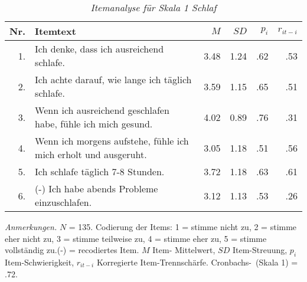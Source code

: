 \begin{table}[htb]
    \caption[Itemanalyse für Skala 1 Schlaf]{\textit {Itemanalyse für Skala 1 Schlaf}} 
    \label{Itemanalyse für Skala 1 Schlaf}
    \centering
    \begin{adjustbox}{width=\textwidth}
    \begin{tabular}{rlrrrr}
      \hline
    Nr.      & Itemtext & \( M \) & \( SD \) & \( p_i \) & \( r_{it-i} \) \\
      \hline
    1.      & Ich denke, dass ich ausreichend schlafe.
      & 3.48     & 1.24    & .62        & .53     \\
    2.      & Ich achte darauf, wie lange ich täglich schlafe.
      & 3.59     & 1.15    & .65        & .51     \\
    3.      & Wenn ich ausreichend geschlafen habe, fühle ich mich gesund.
      & 4.02     & 0.89    & .76        & .31     \\
    4.      & Wenn ich morgens aufstehe, fühle ich mich erholt und ausgeruht.
      & 3.05     & 1.18    & .51        & .56     \\
    5.      & Ich schlafe täglich 7-8 Stunden.
      & 3.72     & 1.18    & .63        & .61     \\
    6.      & (-) Ich habe abends Probleme einzuschlafen.
      & 3.12     & 1.13    & .53        & .26     \\
       \hline
    \end{tabular}
    \end{adjustbox}
    
    \begin{tablenotes}
        \item \textit{Anmerkungen.} \( N \) = 135. Codierung der Items: 1 = stimme
        nicht zu, 2 = stimme eher nicht zu, 3 = stimme teilweise zu, 4 = stimme eher 
        zu, 5 = stimme vollständig zu.\linebreak(-) = recodiertes Item. \( M \) Item-
        Mittelwert, \( SD \) Item-Streuung, \( p_i \) Item-Schwierigkeit, 
        \linebreak\( r_{it-i} \) Korregierte Item-Trennschärfe. Cronbachs-\textalpha \  
        (Skala 1) = .72.
      \end{tablenotes}
    \end{table}